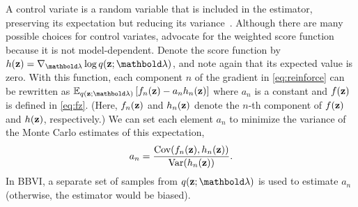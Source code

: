 \documentclass[]{article}
\begin{document}
  A control variate is a random variable
that is included in the estimator, preserving its expectation but
reducing its variance~\citep{Ross2002}. Although there are many
possible choices for control variates, \citet{Ranganath2014} advocate
for the weighted score function because it is not model-dependent.
Denote the score function by
$h(\bz) = \nabla_{\blambda} \log q(\bz;\blambda)$, and note again that
its expected value is zero.  With this function, each component $n$ of
the gradient in \eqref{eq:reinforce} can be rewritten as
$\E{q(\bz;\blambda)}{f_n(\bz)-a_n h_n(\bz)}$ where $a_n$ is a constant
and $f(\mathbf{z})$ is defined in \eqref{eq:fz}.  (Here, $f_n(\mathbf{z})$ and
$h_n(\mathbf{z})$ denote the $n$-th component of $f(\mathbf{z})$ and $h(\mathbf{z})$,
respectively.) We can set each
element $a_n$ to minimize the variance of the Monte Carlo estimates of
this expectation,
\begin{equation}\label{eq:a_n}
  a_n = \frac{\textrm{Cov}(f_n(\mathbf{z}),h_n(\mathbf{z}))}{\textrm{Var}(h_n(\mathbf{z}))}.
\end{equation}
In \gls{BBVI}, a separate set of samples
from $q(\bz;\blambda)$ is used to estimate $a_n$ (otherwise, the
estimator would be biased).

%

% 
\end{document}
